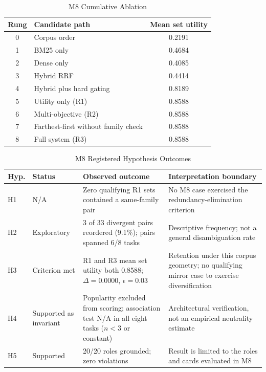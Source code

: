 \documentclass[conference]{IEEEtran}
\begin{document}
\begin{table}[t]
\caption{M8 Cumulative Ablation}
\label{tab:m8-ablation}
\centering
\footnotesize
\begin{tabular}{clc}
\toprule
Rung & Candidate path & Mean set utility \\
\midrule
0 & Corpus order & 0.2191 \\
1 & BM25 only & 0.4684 \\
2 & Dense only & 0.4085 \\
3 & Hybrid RRF & 0.4414 \\
4 & Hybrid plus hard gating & 0.8189 \\
5 & Utility only (R1) & 0.8588 \\
6 & Multi-objective (R2) & 0.8588 \\
7 & Farthest-first without family check & 0.8588 \\
8 & Full system (R3) & 0.8588 \\
\bottomrule
\end{tabular}
\end{table}

\begin{table}[t]
\caption{M8 Registered Hypothesis Outcomes}
\label{tab:m8-hypotheses}
\centering
\footnotesize
\begin{tabularx}{\textwidth}{p{0.45in}p{0.85in}X p{2.00in}}
\toprule
Hyp. & Status & Observed outcome & Interpretation boundary \\
\midrule
H1 & N/A & Zero qualifying R1 sets contained a same-family pair & No M8 case exercised the redundancy-elimination criterion \\
H2 & Exploratory & 3 of 33 divergent pairs reordered (9.1\%); pairs spanned 6/8 tasks & Descriptive frequency; not a general disambiguation rate \\
H3 & Criterion met & R1 and R3 mean set utility both 0.8588; $\Delta=0.0000$, $\epsilon=0.03$ & Retention under this corpus geometry; no qualifying mirror case to exercise diversification \\
H4 & Supported as invariant & Popularity excluded from scoring; association test N/A in all eight tasks ($n<3$ or constant) & Architectural verification, not an empirical neutrality estimate \\
H5 & Supported & 20/20 roles grounded; zero violations & Result is limited to the roles and cards evaluated in M8 \\
\bottomrule
\end{tabularx}
\end{table}
\end{document}
